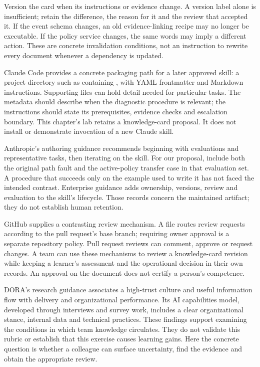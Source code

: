 Version the card when its instructions or evidence change. A version label alone is insufficient; retain the difference, the reason for it and the review that accepted it. If the event schema changes, an old evidence-linking recipe may no longer be executable. If the policy service changes, the same words may imply a different action. These are concrete invalidation conditions, not an instruction to rewrite every document whenever a dependency is updated.

Claude Code provides a concrete packaging path for a later approved skill: a project directory such as  containing , with YAML frontmatter and Markdown instructions. Supporting files can hold detail needed for particular tasks.\autocite{claudeSkills2026} The metadata should describe when the diagnostic procedure is relevant; the instructions should state its prerequisites, evidence checks and escalation boundary. This chapter's lab retains a knowledge-card proposal. It does not install or demonstrate invocation of a new Claude skill.

Anthropic's authoring guidance recommends beginning with evaluations and representative tasks, then iterating on the skill.\autocite{anthropicSkillPracticesCh13} For our proposal, include both the original path fault and the active-policy transfer case in that evaluation set. A procedure that succeeds only on the example used to write it has not faced the intended contrast. Enterprise guidance adds ownership, versions, review and evaluation to the skill's lifecycle.\autocite{anthropicSkillsEnterpriseCh13} Those records concern the maintained artifact; they do not establish human retention.

GitHub supplies a contrasting review mechanism. A  file routes review requests according to the pull request's base branch; requiring owner approval is a separate repository policy.\autocite{githubCodeOwnersCh13} Pull request reviews can comment, approve or request changes.\autocite{githubReviewCh13} A team can use these mechanisms to review a knowledge-card revision while keeping a learner's assessment and the operational decision in their own records. An approval on the document does not certify a person's competence.

DORA's research guidance associates a high-trust culture and useful information flow with delivery and organizational performance.\autocite{doraCultureCh13} Its AI capabilities model, developed through interviews and survey work, includes a clear organizational stance, internal data and technical practices.\autocite{doraCapabilitiesCh13} These findings support examining the conditions in which team knowledge circulates. They do not validate this rubric or establish that this exercise causes learning gains. Here the concrete question is whether a colleague can surface uncertainty, find the evidence and obtain the appropriate review.

